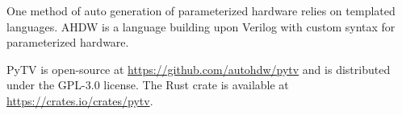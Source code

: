 One method of auto generation of parameterized hardware relies on templated languages.
AHDW \cite{zhao2023automatic} is a language building upon Verilog with custom syntax for parameterized hardware.

PyTV is open-source at \url{https://github.com/autohdw/pytv}
and is distributed under the GPL-3.0 license.
The Rust crate is available at \url{https://crates.io/crates/pytv}.
